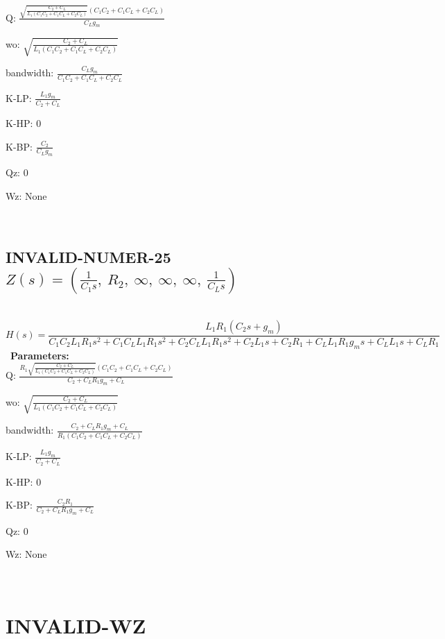 \documentclass{article}
\begin{document}
Q: $\frac{\sqrt{\frac{C_{2} + C_{L}}{L_{1} \left(C_{1} C_{2} + C_{1} C_{L} + C_{2} C_{L}\right)}} \left(C_{1} C_{2} + C_{1} C_{L} + C_{2} C_{L}\right)}{C_{L} g_{m}}$\ 

wo: $\sqrt{\frac{C_{2} + C_{L}}{L_{1} \left(C_{1} C_{2} + C_{1} C_{L} + C_{2} C_{L}\right)}}$\ 

bandwidth: $\frac{C_{L} g_{m}}{C_{1} C_{2} + C_{1} C_{L} + C_{2} C_{L}}$\ 

K-LP: $\frac{L_{1} g_{m}}{C_{2} + C_{L}}$\ 

K-HP: $0$\ 

K-BP: $\frac{C_{2}}{C_{L} g_{m}}$\ 

Qz: $0$\ 

Wz: $\text{None}$\ 

\ 

\subsection{INVALID-NUMER-25 $Z(s) = \left( \frac{1}{C_{1} s}, \  R_{2}, \  \infty, \  \infty, \  \infty, \  \frac{1}{C_{L} s}\right)$ } \ 
\textbf{\[H(s) = \frac{L_{1} R_{1} \left(C_{2} s + g_{m}\right)}{C_{1} C_{2} L_{1} R_{1} s^{2} + C_{1} C_{L} L_{1} R_{1} s^{2} + C_{2} C_{L} L_{1} R_{1} s^{2} + C_{2} L_{1} s + C_{2} R_{1} + C_{L} L_{1} R_{1} g_{m} s + C_{L} L_{1} s + C_{L} R_{1}}\] } \ 
\textbf{Parameters:}\\ 

Q: $\frac{R_{1} \sqrt{\frac{C_{2} + C_{L}}{L_{1} \left(C_{1} C_{2} + C_{1} C_{L} + C_{2} C_{L}\right)}} \left(C_{1} C_{2} + C_{1} C_{L} + C_{2} C_{L}\right)}{C_{2} + C_{L} R_{1} g_{m} + C_{L}}$\ 

wo: $\sqrt{\frac{C_{2} + C_{L}}{L_{1} \left(C_{1} C_{2} + C_{1} C_{L} + C_{2} C_{L}\right)}}$\ 

bandwidth: $\frac{C_{2} + C_{L} R_{1} g_{m} + C_{L}}{R_{1} \left(C_{1} C_{2} + C_{1} C_{L} + C_{2} C_{L}\right)}$\ 

K-LP: $\frac{L_{1} g_{m}}{C_{2} + C_{L}}$\ 

K-HP: $0$\ 

K-BP: $\frac{C_{2} R_{1}}{C_{2} + C_{L} R_{1} g_{m} + C_{L}}$\ 

Qz: $0$\ 

Wz: $\text{None}$\ 

\ 

\section{INVALID-WZ}\ 
\end{document}
